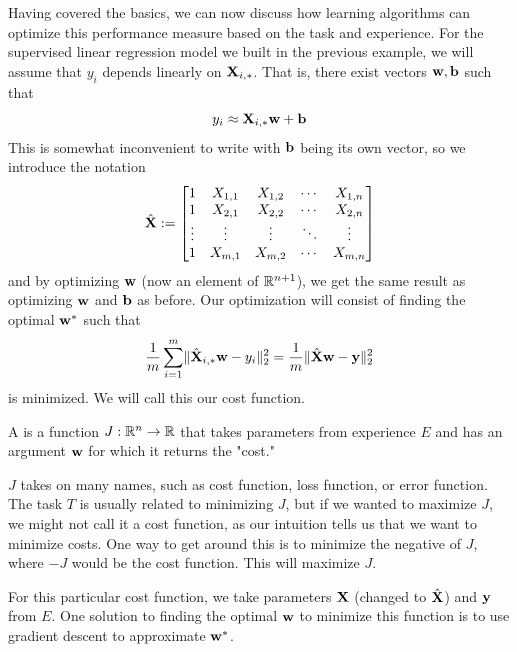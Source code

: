 Having covered the basics, we can now discuss how learning algorithms can optimize this performance measure based on the task and experience. For the supervised linear regression model we built in the previous example, we will assume that $y_i$ depends linearly on $\MX_{i,\ast}$. That is, there exist vectors $\vw, \vb$ such that
$$ y_i \approx \MX_{i, \ast} \vw + \vb $$
This is somewhat inconvenient to write with $\vb$ being its own vector, so we introduce the notation
$$\hat{\MX} :=
\begin{bmatrix}
1 & X_{1,1} & X_{1,2} & \cdots & X_{1,n} \\
1 & X_{2,1} & X_{2,2} & \cdots & X_{2,n} \\
\vdots & \vdots & \vdots & \ddots & \vdots \\
1 & X_{m,1} & X_{m,2} & \cdots & X_{m,n} \\
\end{bmatrix}$$
and by optimizing $\vw$ (now an element of $\R^{n+1}$), we get the same result as optimizing $\vw$ and $\vb$ as before. Our optimization will consist of finding the optimal $\vw^\ast$ such that
$$ \frac{1}{m} \sum \limits_{i=1}^m \lVert \hat{\MX}_{i,\ast} \vw - y_i \rVert_2^2 =  \frac{1}{m} \lVert \hat{\MX} \vw - \vy \rVert_2^2$$
is minimized. We will call this our cost function.

\begin{definition}
A  is a function $J : \R^n \to \R$ that takes parameters from experience $E$ and has an argument $\vw$ for which it returns the "cost."
\end{definition}

\begin{note}
$J$ takes on many names, such as cost function, loss function, or error function. The task $T$ is usually related to minimizing $J$, but if we wanted to maximize $J$, we might not call it a cost function, as our intuition tells us that we want to minimize costs. One way to get around this is to minimize the negative of $J$, where $-J$ would be the cost function. This will maximize $J$.
\end{note}

For this particular cost function, we take parameters $\MX$ (changed to $\hat{\MX}$) and $\vy$ from $E$. One solution to finding the optimal $\vw$ to minimize this function is to use gradient descent to approximate $\vw^\ast$.

